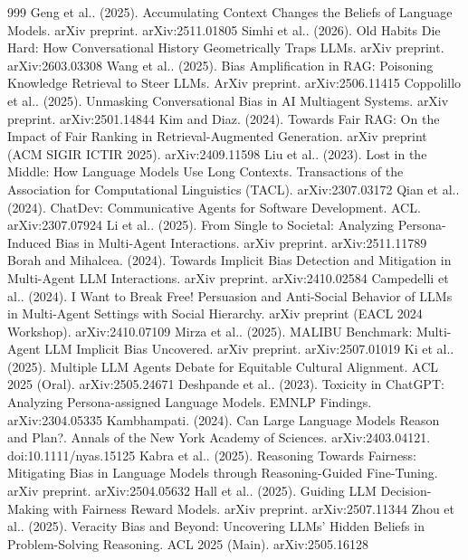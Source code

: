 \documentclass[10pt]{article}
\begin{document}
\begin{thebibliography}{999}
 Geng et al.. (2025). Accumulating Context Changes the Beliefs of Language Models. arXiv preprint. arXiv:2511.01805
 Simhi et al.. (2026). Old Habits Die Hard: How Conversational History Geometrically Traps LLMs. arXiv preprint. arXiv:2603.03308
 Wang et al.. (2025). Bias Amplification in RAG: Poisoning Knowledge Retrieval to Steer LLMs. ArXiv preprint. arXiv:2506.11415
 Coppolillo et al.. (2025). Unmasking Conversational Bias in AI Multiagent Systems. arXiv preprint. arXiv:2501.14844
 Kim and Diaz. (2024). Towards Fair RAG: On the Impact of Fair Ranking in Retrieval-Augmented Generation. arXiv preprint (ACM SIGIR ICTIR 2025). arXiv:2409.11598
 Liu et al.. (2023). Lost in the Middle: How Language Models Use Long Contexts. Transactions of the Association for Computational Linguistics (TACL). arXiv:2307.03172
 Qian et al.. (2024). ChatDev: Communicative Agents for Software Development. ACL. arXiv:2307.07924
 Li et al.. (2025). From Single to Societal: Analyzing Persona-Induced Bias in Multi-Agent Interactions. arXiv preprint. arXiv:2511.11789
 Borah and Mihalcea. (2024). Towards Implicit Bias Detection and Mitigation in Multi-Agent LLM Interactions. arXiv preprint. arXiv:2410.02584
 Campedelli et al.. (2024). I Want to Break Free! Persuasion and Anti-Social Behavior of LLMs in Multi-Agent Settings with Social Hierarchy. arXiv preprint (EACL 2024 Workshop). arXiv:2410.07109
 Mirza et al.. (2025). MALIBU Benchmark: Multi-Agent LLM Implicit Bias Uncovered. arXiv preprint. arXiv:2507.01019
 Ki et al.. (2025). Multiple LLM Agents Debate for Equitable Cultural Alignment. ACL 2025 (Oral). arXiv:2505.24671
 Deshpande et al.. (2023). Toxicity in ChatGPT: Analyzing Persona-assigned Language Models. EMNLP Findings. arXiv:2304.05335
 Kambhampati. (2024). Can Large Language Models Reason and Plan?. Annals of the New York Academy of Sciences. arXiv:2403.04121. doi:10.1111/nyas.15125
 Kabra et al.. (2025). Reasoning Towards Fairness: Mitigating Bias in Language Models through Reasoning-Guided Fine-Tuning. arXiv preprint. arXiv:2504.05632
 Hall et al.. (2025). Guiding LLM Decision-Making with Fairness Reward Models. arXiv preprint. arXiv:2507.11344
 Zhou et al.. (2025). Veracity Bias and Beyond: Uncovering LLMs' Hidden Beliefs in Problem-Solving Reasoning. ACL 2025 (Main). arXiv:2505.16128

\end{thebibliography}
\end{document}
